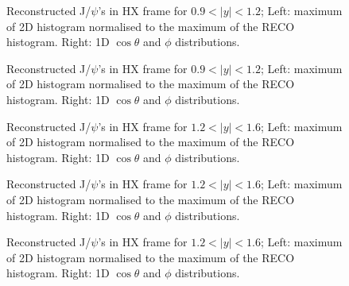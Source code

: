 \documentclass[12pt]{article}
\newcommand{\jpsi}{J/$\psi$}
\begin{document}
\begin{figure}[htbp]
\centering
{}
\caption{Reconstructed \jpsi's in HX frame for $0.9 < |y| < 1.2$; Left: maximum of 2D histogram normalised to the maximum of the RECO histogram. Right: 1D $\cos\theta$ and $\phi$ distributions.}
\label{fig:trackerMuonsVsEta}
\end{figure} \clearpage 


\begin{figure}[htbp]
\centering
{}
\caption{Reconstructed \jpsi's in HX frame for $0.9 < |y| < 1.2$; Left: maximum of 2D histogram normalised to the maximum of the RECO histogram. Right: 1D $\cos\theta$ and $\phi$ distributions.}
\label{fig:trackerMuonsVsEta}
\end{figure} \clearpage 



\begin{figure}[htbp]
\centering
{}
\caption{Reconstructed \jpsi's in HX frame for $1.2 < |y| < 1.6$; Left: maximum of 2D histogram normalised to the maximum of the RECO histogram. Right: 1D $\cos\theta$ and $\phi$ distributions.}
\label{fig:trackerMuonsVsEta}
\end{figure} \clearpage 

\begin{figure}[htbp]
\centering
{}
\caption{Reconstructed \jpsi's in HX frame for $1.2 < |y| < 1.6$; Left: maximum of 2D histogram normalised to the maximum of the RECO histogram. Right: 1D $\cos\theta$ and $\phi$ distributions.}
\label{fig:trackerMuonsVsEta}
\end{figure} \clearpage 

\begin{figure}[htbp]
\centering
{}
\caption{Reconstructed \jpsi's in HX frame for $1.2 < |y| < 1.6$; Left: maximum of 2D histogram normalised to the maximum of the RECO histogram. Right: 1D $\cos\theta$ and $\phi$ distributions.}
\label{fig:trackerMuonsVsEta}
\end{figure} \clearpage 
\end{document}
